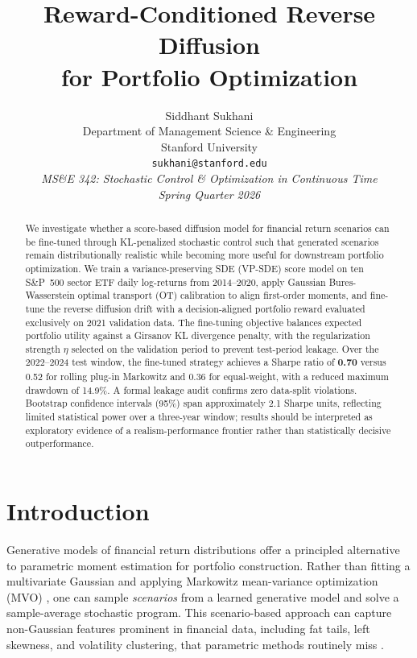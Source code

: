 \documentclass{article}
\title{Reward-Conditioned Reverse Diffusion\\for Portfolio Optimization}
\author{%
  Siddhant Sukhani \\
  Department of Management Science \& Engineering \\
  Stanford University \\
  \texttt{sukhani@stanford.edu} \\[4pt]
  \textit{MS\&E 342: Stochastic Control \& Optimization in Continuous Time} \\
  \textit{Spring Quarter 2026}
}
\begin{document}
\maketitle

\begin{abstract}
We investigate whether a score-based diffusion model for financial return
scenarios can be fine-tuned through KL-penalized stochastic control such that
generated scenarios remain distributionally realistic while becoming more useful
for downstream portfolio optimization. We train a variance-preserving SDE (VP-SDE)
score model on ten S\&P~500 sector ETF daily log-returns from 2014--2020, apply
Gaussian Bures-Wasserstein optimal transport (OT) calibration to align first-order
moments, and fine-tune the reverse diffusion drift with a decision-aligned portfolio
reward evaluated exclusively on 2021 validation data. The fine-tuning objective
balances expected portfolio utility against a Girsanov KL divergence penalty, with
the regularization strength $\eta$ selected on the validation period to prevent
test-period leakage. Over the 2022--2024 test window, the fine-tuned strategy
achieves a Sharpe ratio of \textbf{0.70} versus 0.52 for rolling plug-in Markowitz
and 0.36 for equal-weight, with a reduced maximum drawdown of 14.9\%. A formal
leakage audit confirms zero data-split violations. Bootstrap confidence intervals
(95\%) span approximately 2.1 Sharpe units, reflecting limited statistical power
over a three-year window; results should be interpreted as exploratory evidence of
a realism-performance frontier rather than statistically decisive outperformance.
\end{abstract}

\begin{center}
\end{center}

\section{Introduction}
\label{sec:intro}

Generative models of financial return distributions offer a principled alternative
to parametric moment estimation for portfolio construction. Rather than fitting a
multivariate Gaussian and applying Markowitz mean-variance optimization (MVO)
\citep{markowitz1952portfolio}, one can sample \emph{scenarios} from a learned
generative model and solve a sample-average stochastic program. This scenario-based
approach can capture non-Gaussian features prominent in financial data, including
fat tails, left skewness, and volatility clustering, that parametric methods routinely miss
\citep{cont2001, mcneil2015quantitative}.
\end{document}
